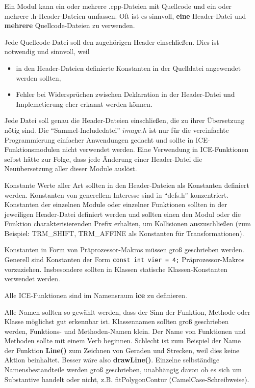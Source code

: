 Ein Modul kann ein oder mehrere .cpp-Dateien mit Quellcode und ein oder
mehrere .h-Header-Dateien umfassen. Oft ist es sinnvoll, {\bf eine} 
Header-Datei und {\bf mehrere} Quellcode-Dateien zu verwenden.

Jede Quellcode-Datei soll den zugehörigen Header einschließen. Dies ist 
notwendig und sinnvoll, weil
\begin{itemize}
\item in den Header-Dateien definierte Konstanten in der Quelldatei angewendet
  werden sollten,
\item Fehler bei Widersprüchen zwischen Deklaration in der Header-Datei und 
Implemetierung eher erkannt werden können.
\end{itemize}

Jede Datei soll genau die Header-Dateien einschließen, die zu ihrer
Übersetzung nötig sind. 
Die ``Sammel-Includedatei'' $image.h$ ist nur für die vereinfachte
Programmierung einfacher Anwendungen gedacht und sollte in 
ICE-Funktionsmodulen nicht verwendet werden. Eine Verwendung in 
ICE-Funktionen selbst hätte zur Folge, dass jede Änderung einer 
Header-Datei die Neuübersetzung aller dieser Module auslöst.

Konstante Werte aller Art sollten in den Header-Dateien als Konstanten 
definiert werden. Konstanten von generellem Interesse sind in ``defs.h''
konzentriert. Konstanten der einzelnen Module oder einzelner Funktionen
sollten in der jeweiligen Header-Datei definiert werden und sollten einen
den Modul oder die Funktion charakterisierenden Prefix erhalten, um
Kollisionen auszuschließen (zum Beispiel: TRM\_SHIFT, TRM\_AFFINE als 
Konstanten für Transformationen). 

Konstanten in Form von Präprozessor-Makros müssen groß geschrieben werden.
Generell sind Konstanten der Form \verb+const int vier = 4;+ Präprozessor-Makros
vorzuziehen. Insbesondere sollten in Klassen statische Klassen-Konstanten
verwendet werden.

Alle ICE-Funktionen sind im Namensraum {\bf ice} zu definieren.

Alle Namen sollten so gewählt werden, dass der Sinn der Funktion, Methode oder
Klasse möglichst gut erkennbar ist. Klassennamen sollten groß geschrieben 
werden, Funktions- und Methoden-Namen klein.
Der Name von Funktionen und Methoden sollte mit einem Verb beginnen.
Schlecht ist zum Beispiel der Name der Funktion {\bf Line()} zum 
Zeichnen von Geraden und Strecken, weil dies keine Aktion beinhaltet. 
Besser wäre also {\bf drawLine()}. 
Einzelne selbständige Namensbestandteile werden groß geschrieben, 
unabhängig davon ob es sich um Substantive handelt oder nicht, 
z.B. fitPolygonContur (CamelCase-Schreibweise).

